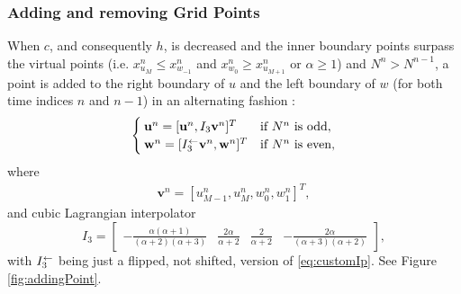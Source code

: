 \subsubsection{Adding and removing Grid Points}
When $c$, and consequently $h$, is decreased and the inner boundary points surpass the virtual points (i.e. $x_{u_M}^n \leq x_{w_{-1}}^n$ and $x_{w_0}^n \geq x_{u_{M+1}}^n$ or $
\alpha \geq 1$) and $N^n >  N^{n-1}$, a point is added to the right boundary of $u$ and the left boundary of $w$ (for both time indices $n$ and $n-1$) in an alternating fashion : 
\begin{equation}\label{eq:addingPoint}
        \begin{cases}\mathbf{u}^n = [\mathbf{u}^n, I_3\mathbf{v}^n]^T & \text{if $N^n $ is odd},\\
        \mathbf{w}^n = [I_3^\leftarrow\mathbf{v}^n, \mathbf{w}^n]^T & \text{if $ N^n$ is even},
        \end{cases}
\end{equation}
where 
\begin{align*}
\mathbf{v}^n = [u_{M-1}^n, u_M^n, w_0^n, w_1^n]^T,%
\end{align*}
and cubic Lagrangian interpolator
\begin{equation}\label{eq:customIp}
    I_3 = \begin{bmatrix} -\frac{\alpha(\alpha+1)}{(\alpha+2)(\alpha+3)} &\frac{2\alpha}{\alpha+2} &\frac{2}{\alpha+2} 
    &-\frac{2\alpha}{(\alpha+3)(\alpha+2)}
    \end{bmatrix},
\end{equation}
with $I_3^\leftarrow$ being just a flipped, not shifted, version of \eqref{eq:customIp}.
See Figure \ref{fig:addingPoint}.
%
